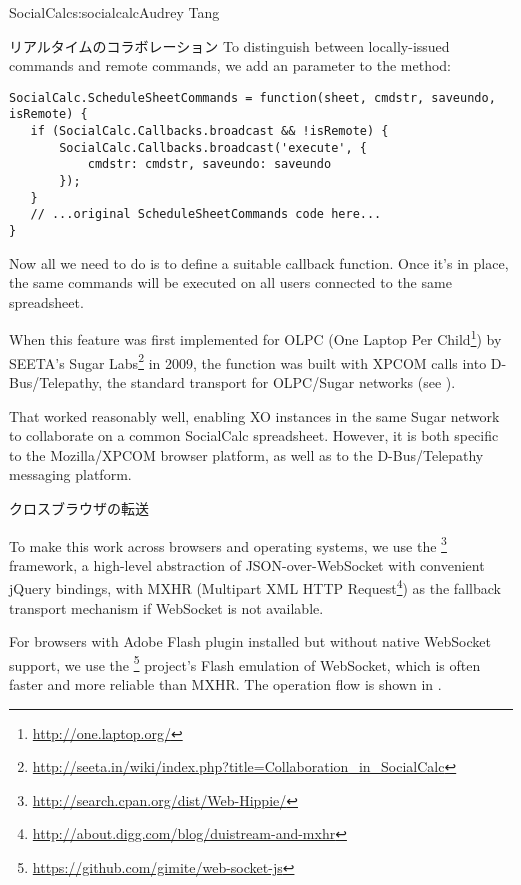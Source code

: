 \begin{aosachapter}{SocialCalc}{s:socialcalc}{Audrey Tang}
\begin{aosasect1}{リアルタイムのコラボレーション}
To distinguish between locally-issued commands and remote commands, we
add an  parameter to the 
method:

\begin{verbatim}
SocialCalc.ScheduleSheetCommands = function(sheet, cmdstr, saveundo, isRemote) {
   if (SocialCalc.Callbacks.broadcast && !isRemote) {
       SocialCalc.Callbacks.broadcast('execute', {
           cmdstr: cmdstr, saveundo: saveundo
       });
   }
   // ...original ScheduleSheetCommands code here...
}
\end{verbatim}

\noindent Now all we need to do is to define a suitable
 callback function.  Once it's
in place, the same commands will be executed on all users connected
to the same spreadsheet.

When this feature was first implemented for OLPC (One Laptop Per 
Child\footnote{\url{http://one.laptop.org/}}) by SEETA's Sugar 
Labs\footnote{\url{http://seeta.in/wiki/index.php?title=Collaboration_in_SocialCalc}}
in 2009, the  function was built with XPCOM calls into
D-Bus/Telepathy, the standard transport for OLPC/Sugar networks (see
).


That worked reasonably well, enabling XO instances in the same Sugar
network to collaborate on a common SocialCalc spreadsheet.  However,
it is both specific to the Mozilla/XPCOM browser platform, as well as
to the D-Bus/Telepathy messaging platform.

\begin{aosasect2}{クロスブラウザの転送}

To make this work across browsers and operating systems, we use the
\footnote{\url{http://search.cpan.org/dist/Web-Hippie/}}
framework, a high-level abstraction of JSON-over-WebSocket with
convenient jQuery bindings, with MXHR (Multipart XML HTTP
Request\footnote{\url{http://about.digg.com/blog/duistream-and-mxhr}})
as the fallback transport mechanism if WebSocket is not available.

For browsers with Adobe Flash plugin installed but without native
WebSocket support, we use the
\footnote{\url{https://github.com/gimite/web-socket-js}}
project's Flash emulation of WebSocket, which is often faster and more reliable
than MXHR.  The operation flow is shown in .


\end{aosasect2}
\end{aosasect1}
\end{aosachapter}
